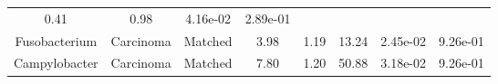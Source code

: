 \documentclass[12pt,]{article}
\begin{document}
\begin{longtable}[]{@{}cccccccc@{}}
\begin{minipage}[t]{0.14\columnwidth}
0.41\strut
\end{minipage} & \begin{minipage}[t]{0.14\columnwidth}\centering\strut
0.98\strut
\end{minipage} & \begin{minipage}[t]{0.06\columnwidth}\centering\strut
4.16e-02\strut
\end{minipage} & \begin{minipage}[t]{0.06\columnwidth}\centering\strut
2.89e-01\strut
\end{minipage}\tabularnewline
\begin{minipage}[t]{0.18\columnwidth}\centering\strut
Fusobacterium\strut
\end{minipage} & \begin{minipage}[t]{0.07\columnwidth}\centering\strut
Carcinoma\strut
\end{minipage} & \begin{minipage}[t]{0.09\columnwidth}\centering\strut
Matched\strut
\end{minipage} & \begin{minipage}[t]{0.03\columnwidth}\centering\strut
3.98\strut
\end{minipage} & \begin{minipage}[t]{0.14\columnwidth}\centering\strut
1.19\strut
\end{minipage} & \begin{minipage}[t]{0.14\columnwidth}\centering\strut
13.24\strut
\end{minipage} & \begin{minipage}[t]{0.06\columnwidth}\centering\strut
2.45e-02\strut
\end{minipage} & \begin{minipage}[t]{0.06\columnwidth}\centering\strut
9.26e-01\strut
\end{minipage}\tabularnewline
\begin{minipage}[t]{0.18\columnwidth}\centering\strut
Campylobacter\strut
\end{minipage} & \begin{minipage}[t]{0.07\columnwidth}\centering\strut
Carcinoma\strut
\end{minipage} & \begin{minipage}[t]{0.09\columnwidth}\centering\strut
Matched\strut
\end{minipage} & \begin{minipage}[t]{0.03\columnwidth}\centering\strut
7.80\strut
\end{minipage} & \begin{minipage}[t]{0.14\columnwidth}\centering\strut
1.20\strut
\end{minipage} & \begin{minipage}[t]{0.14\columnwidth}\centering\strut
50.88\strut
\end{minipage} & \begin{minipage}[t]{0.06\columnwidth}\centering\strut
3.18e-02\strut
\end{minipage} & \begin{minipage}[t]{0.06\columnwidth}\centering\strut
9.26e-01\strut
\end{minipage}\tabularnewline
\bottomrule
\end{longtable}
\end{document}
